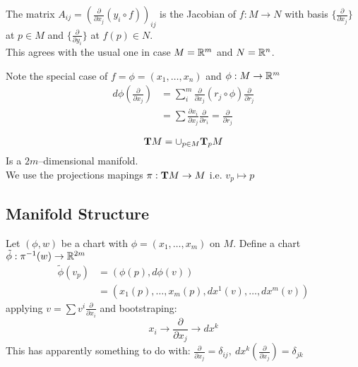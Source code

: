 The matrix $A_{ij}=(\frac{\partial}{\partial x_j}(y_i\circ f))_{ij}$ is the Jacobian of $f:M\to N$ with basis $\{\frac{\partial}{\partial x_j}\}$ at $p\in M$ and $\{\frac{\partial}{\partial y_i}\}$ at $f(p)\in N$.\\
This agrees with the usual one in case $M=\mathbb{R}^m$ and $N=\mathbb{R}^n$.   

Note the special case of $f=\phi=(x_1,\ldots,x_n)$ and $\phi:M\to \mathbb{R}^m$ 
\begin{align*}
d\phi\left(\frac{\partial}{\partial x_j}\right) &= \sum_i^m \frac{\partial}{\partial x_j} (r_j\circ\phi) \frac{\partial}{\partial r_j}    \\
                    &=\sum \frac{\partial x_i}{\partial x_j} \frac{\partial}{\partial r_i} = \frac{\partial}{\partial r_j}
\end{align*}

\begin{ddef}
$$\text{\textbf{T}} M = \cup_{p\in M} \text{\textbf{T}}_pM$$
Is a $2m$--dimensional manifold.\\
We use the projections mapings $\pi: \text{\textbf{T}} M\to M$ i.e. $v_p \mapsto p$ 
\end{ddef}      

\subsection{Manifold Structure}
Let $(\phi,w)$ be a chart with $\phi=(x_1,\ldots, x_m)$ on $M$. Define a chart $\tilde \phi: \pi^{-1} (w)\to \mathbb{R}^{2m}$ 
\begin{align*}
\tilde \phi(v_p) & = (\phi(p), d\phi(v)) \\
                 & = (x_1(p),\ldots, x_m(p), dx^1(v),\ldots, dx^m(v))
\end{align*}
applying $v=\sum v^i \frac{\partial}{\partial x_i} $ and bootstraping: 
$$ x_i \to \frac{\partial}{\partial x_j} \to dx^k $$
This has apparently something to do with: $\frac{\partial}{\partial x_j} =\delta_{ij},\ dx^k \left(\frac{\partial}{\partial x_j} \right) = \delta_{jk}$   
